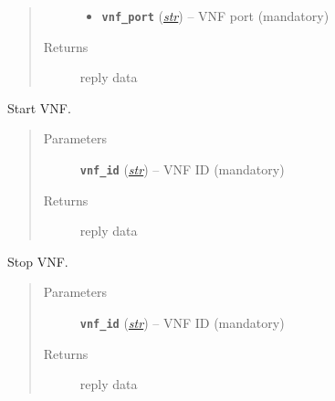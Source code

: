 \documentclass[letterpaper,10pt,english]{sphinxmanual}
\begin{document}
\begin{fulllineitems}
\begin{fulllineitems}
\begin{quote}
\begin{description}
\begin{itemize}
\item {} 
\textbf{\texttt{vnf\_port}} (\href{https://docs.python.org/2.7/library/functions.html\#str}{\emph{str}}) -- VNF port (mandatory)

\end{itemize}

\item[{Returns}] \leavevmode
reply data

\end{description}\end{quote}

\end{fulllineitems}


\begin{fulllineitems}
\label{util/adapter:escape.util.adapter.VNFStarterAPI.startVNF}
Start VNF.
\begin{quote}\begin{description}
\item[{Parameters}] \leavevmode
\textbf{\texttt{vnf\_id}} (\href{https://docs.python.org/2.7/library/functions.html\#str}{\emph{str}}) -- VNF ID (mandatory)

\item[{Returns}] \leavevmode
reply data

\end{description}\end{quote}

\end{fulllineitems}


\begin{fulllineitems}
\label{util/adapter:escape.util.adapter.VNFStarterAPI.stopVNF}
Stop VNF.
\begin{quote}\begin{description}
\item[{Parameters}] \leavevmode
\textbf{\texttt{vnf\_id}} (\href{https://docs.python.org/2.7/library/functions.html\#str}{\emph{str}}) -- VNF ID (mandatory)

\item[{Returns}] \leavevmode
reply data

\end{description}\end{quote}

\end{fulllineitems}


\begin{fulllineitems}
\label{util/adapter:escape.util.adapter.VNFStarterAPI.getVNFInfo}
\end{fulllineitems}


\end{fulllineitems}
\end{document}
